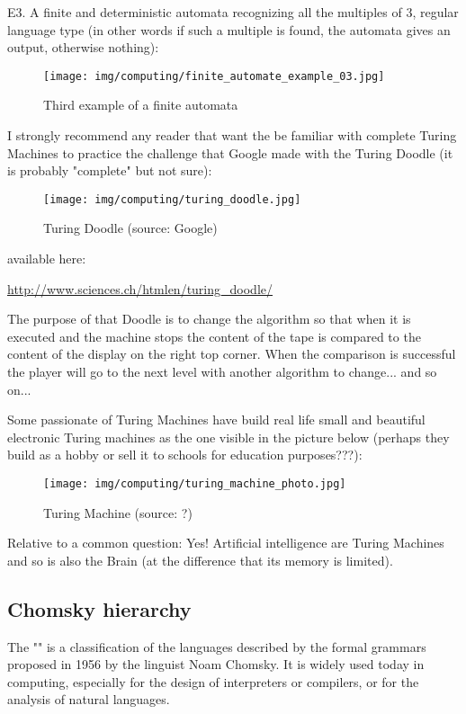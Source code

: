 	\begin{tcolorbox}[colframe=black,colback=white,sharp corners]
	E3.  A finite and deterministic automata recognizing all the multiples of $3$, regular language type (in other words if such a multiple is found, the automata gives an output, otherwise nothing):
	\begin{figure}[H]
		\centering
		\texttt{[image: img/computing/finite\_automate\_example\_03.jpg]}
		\caption{Third example of a finite automata}
	\end{figure}
	\end{tcolorbox}
	I strongly recommend any reader that want the be familiar with complete Turing Machines to practice the challenge that Google made with the Turing Doodle (it is probably "complete" but not sure):
	\begin{figure}[H]
		\centering
		\texttt{[image: img/computing/turing\_doodle.jpg]}
		\caption{Turing Doodle (source: Google)}
	\end{figure}
	available here:
	\begin{center}
		\url{http://www.sciences.ch/htmlen/turing_doodle/}
	\end{center}
	The purpose of that Doodle is to change the algorithm so that when it is executed and the machine stops the content of the tape is compared to the content of the display on the right top corner. When the comparison is successful the player will go to the next level with another algorithm to change... and so on...
	
	Some passionate of Turing Machines have build real life small and beautiful electronic Turing machines as the one visible in the picture below (perhaps they build as a hobby or sell it to schools for education purposes???):
	\begin{figure}[H]
		\centering
		\texttt{[image: img/computing/turing\_machine\_photo.jpg]}
		\caption{Turing Machine (source: ?)}
	\end{figure}
	\begin{tcolorbox}[title=Remark,colframe=black,arc=10pt]
	Relative to a common question: Yes! Artificial intelligence are Turing Machines and so is also the Brain (at the difference that its memory is limited).
	\end{tcolorbox}
	
	\pagebreak
	\subsection{Chomsky hierarchy}
	The "" is a classification of the languages described by the formal grammars proposed in 1956 by the linguist Noam Chomsky. It is widely used today in computing, especially for the design of interpreters or compilers, or for the analysis of natural languages.
	

